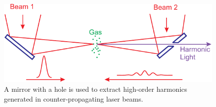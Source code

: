 \documentclass[oneside, astronomy, noacknowlegments]{BYUPhys}
\begin{document}
\begin{figure}
    \centerline{\includegraphics{Graphic1}}
    \caption[Setup for using counter-propagating light]{\label{fig:MirrorDiagram}
     A mirror with a hole is used to extract high-order harmonics generated in
     counter-propagating laser beams.}
\end{figure}







 

 \printindex
\end{document}
